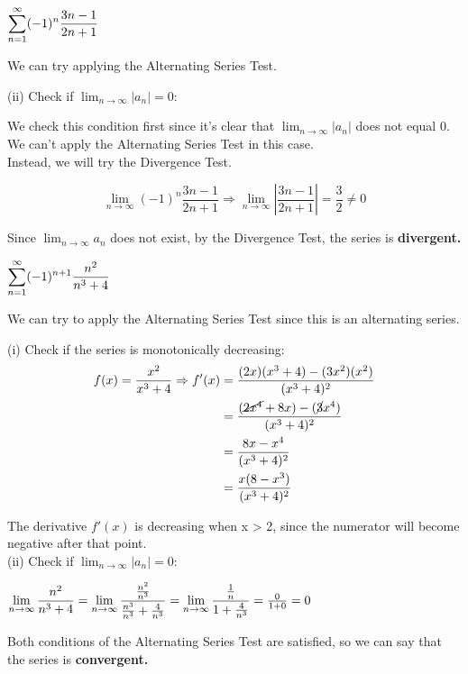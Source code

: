 \documentclass[12pt]{article}
\newcommand{\inftylim}[1]{\mathlarger{\lim_{n \to \infty}#1}}
\begin{document}
\begin{solution}
$\mathlarger{\sum^{\infty}_{n=1} (-1)^n \frac{3n - 1}{2n + 1}}$

We can try applying the Alternating Series Test.



(ii) Check if $\lim_{n \to \infty} \left| a_n \right| = 0$:

We check this condition first since it's clear that $\lim_{n \to \infty} \left| a_n\right|$ does not equal 0. We can't apply the Alternating Series Test in this case.~\\

Instead, we will try the Divergence Test.

$$\lim_{n \to \infty} (-1)^n \frac{3n - 1}{2n + 1} \Rightarrow \lim_{n \to \infty} \left| \frac{3n - 1}{2n + 1} \right| = \frac{3}{2} \neq 0 $$

Since $\lim_{n \to \infty} a_n$ does not exist, by the Divergence Test, the series is \textbf{divergent.} 
\end{solution}

\begin{solution}
$\mathlarger{\sum^{\infty}_{n=1} (-1)^{n +1} \frac{n^2}{n^3 + 4}}$ 

We can try to apply the Alternating Series Test since this is an alternating series.


(i) Check if the series is monotonically decreasing:
\begin{align*} f(x) = \frac{x^2}{x^3 + 4} \Rightarrow f'(x) &= \frac{(2x)(x^{3} + 4) - (3x^{2})(x^2)}{(x^3 + 4)^2} \\
&= \frac{(\cancel{2x^4} + 8x) - (\cancel{3}x^4)}{(x^3 + 4)^2} \\
&= \frac{8x - x^4}{(x^3 + 4)^2} \\
&= \frac{x(8 - x^3)}{(x^3 + 4)^2}
\end{align*}

The derivative $f'(x)$ is decreasing when x > 2, since the numerator will become negative after that point. ~\\

(ii) Check if $\lim_{n \to \infty} \left| a_n \right| = 0$: 

$\inftylim{\frac{n^2}{n^3 + 4}} = \inftylim{\frac{\frac{n^2}{n^3}}{\frac{n^3}{n^3} + \frac{4}{n^3}}} = \inftylim{\frac{\frac{1}{n}}{1+ \frac{4}{n^3}}} = \frac{0}{1 + 0} = 0$

Both conditions of the Alternating Series Test are satisfied, so we can say that the series is \textbf{convergent.}

\end{solution}
\end{document}
